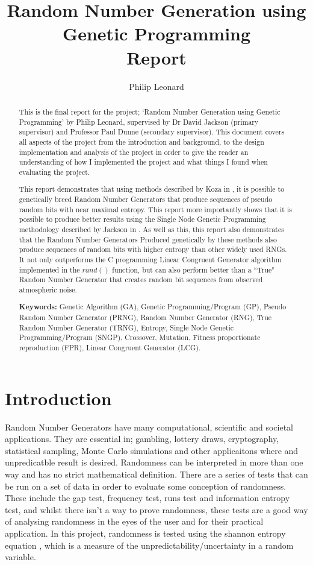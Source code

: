 \documentclass[a4paper,10.5pt]{article}
\title{Random Number Generation using Genetic Programming\\ Report}
\author{Philip Leonard}
\begin{document}
\maketitle

\begin{abstract}
This is the final report for the project; `Random Number Generation using Genetic Programming' by Philip Leonard, supervised by Dr David Jackson (primary supervisor) and Professor Paul Dunne (secondary supervisor). This document covers all aspects of the project from the introduction and background, to the design implementation and analysis of the project in order to give the reader an understanding of how I implemented the project and what things I found when evaluating the project.

This report demonstrates that using methods described by Koza in \cite{kozarng}, it is possible to genetically breed Random Number Generators that produce sequences of pseudo random bits with near maximal entropy. This report more importantly shows that it is possible to produce better results using the Single Node Genetic Programming methodology described by Jackson in \cite{jacksonsngp}. As well as this, this report also demonstrates that the Random Number Generators Produced genetically by these methods also produce sequences of random bits with higher entropy than other widely used RNGs. It not only outperforms the C programming Linear Congruent Generator algorithm implemented in the $rand()$ function, but can also perform better than a ``True" Random Number Generator that creates random bit sequences from observed atmospheric noise.\newline


\noindent \textbf{Keywords:} Genetic Algorithm (GA), Genetic Programming/Program (GP), Pseudo Random Number Generator (PRNG), Random Number Generator (RNG), True Random Number Generator (TRNG), Entropy, Single Node Genetic Programming/Program (SNGP), Crossover, Mutation, Fitness proportionate reproduction (FPR), Linear Congruent Generator (LCG).
\end{abstract}

\newpage

\tableofcontents
\newpage
\section{Introduction}
Random Number Generators have many computational, scientific and societal applications. They are essential in; gambling, lottery draws, cryptography, statistical sampling, Monte Carlo simulations and other applicaitons where and unpredicatble result is desired. Randomness can be interpreted in more than one way and has no strict mathematical definition. There are a series of tests that can be run on a set of data in order to evaluate some conception of randomness. These include the gap test, frequency test, runs test and information entropy test, and whilst there isn't a way to prove randomness, these tests are a good way of analysing randomness in the eyes of the user and for their practical application. In this project, randomness is tested using the shannon entropy equation \cite[p.2]{kozarng}, which is a measure of the unpredictability/uncertainty in a random variable.
\end{document}
